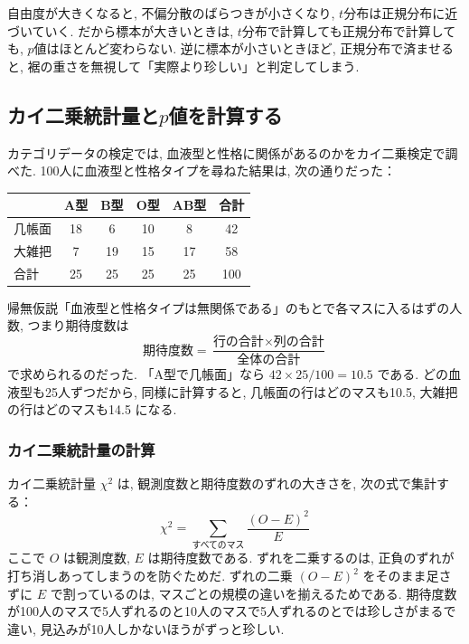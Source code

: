     自由度が大きくなると, 不偏分散のばらつきが小さくなり, $t$分布は正規分布に近づいていく.
    だから標本が大きいときは, $t$分布で計算しても正規分布で計算しても, $p$値はほとんど変わらない.
    逆に標本が小さいときほど, 正規分布で済ませると, 裾の重さを無視して「実際より珍しい」と判定してしまう.


  \subsection{カイ二乗統計量と\texorpdfstring{$p$}{p}値を計算する}

    カテゴリデータの検定では, 血液型と性格に関係があるのかをカイ二乗検定で調べた.
    100人に血液型と性格タイプを尋ねた結果は, 次の通りだった：

    \begin{center}
      \begin{tabular}{l|cccc|c}
            & A型 & B型 & O型 & AB型 & 合計 \\
      \hline
      几帳面 & 18  & 6   & 10  & 8    & 42 \\
      大雑把 & 7   & 19  & 15  & 17   & 58 \\
      \hline
      合計   & 25  & 25  & 25  & 25   & 100
      \end{tabular}
    \end{center}

    帰無仮説「血液型と性格タイプは無関係である」のもとで各マスに入るはずの人数, つまり期待度数は
    \[
    \text{期待度数} = \frac{\text{行の合計} \times \text{列の合計}}{\text{全体の合計}}
    \]
    で求められるのだった.
    「A型で几帳面」なら $42 \times 25 / 100 = 10.5$ である.
    どの血液型も25人ずつだから, 同様に計算すると, 几帳面の行はどのマスも10.5, 大雑把の行はどのマスも14.5 になる.

    \subsubsection*{カイ二乗統計量の計算}

    カイ二乗統計量 $\chi^2$ は, 観測度数と期待度数のずれの大きさを, 次の式で集計する：
    \[
    \chi^2 = \sum_{\text{すべてのマス}} \frac{(O - E)^2}{E}
    \]
    ここで $O$ は観測度数, $E$ は期待度数である.
    ずれを二乗するのは, 正負のずれが打ち消しあってしまうのを防ぐためだ.
    ずれの二乗 $(O - E)^2$ をそのまま足さずに $E$ で割っているのは, マスごとの規模の違いを揃えるためである.
    期待度数が100人のマスで5人ずれるのと10人のマスで5人ずれるのとでは珍しさがまるで違い, 見込みが10人しかないほうがずっと珍しい.

